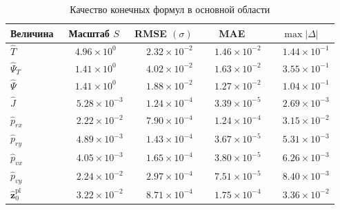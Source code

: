 \begin{table}[htbp]
	\centering
	\caption{Качество конечных формул в основной области}
	\label{tab:chap2_main_metrics}
	\begin{tabular}{l c c c c}
		\toprule
		Величина & Масштаб $S$ & RMSE $(\sigma)$ & MAE & $\max |\Delta|$ \\
		\midrule
		$\widehat{T}$ &
		$\phantom{-}4.96\times10^{0\phantom{-}}$ &
		$\phantom{-}2.32\times10^{-2}$ &
		$\phantom{-}1.46\times10^{-2}$ &
		$\phantom{-}1.44\times10^{-1}$ \\
		
		$\widehat{\Psi}_{T}$ &
		$\phantom{-}1.41\times10^{0\phantom{-}}$ &
		$\phantom{-}4.02\times10^{-2}$ &
		$\phantom{-}1.63\times10^{-2}$ &
		$\phantom{-}3.55\times10^{-1}$ \\
		
		$\widehat{\Psi}$ &
		$\phantom{-}1.41\times10^{0\phantom{-}}$ &
		$\phantom{-}1.88\times10^{-2}$ &
		$\phantom{-}1.27\times10^{-2}$ &
		$\phantom{-}1.04\times10^{-1}$ \\
		
		$\widehat{J}$ &
		$\phantom{-}5.28\times10^{-3}$ &
		$\phantom{-}1.24\times10^{-4}$ &
		$\phantom{-}3.39\times10^{-5}$ &
		$\phantom{-}2.69\times10^{-3}$ \\
		
		$\widehat{p}_{rx}$ &
		$\phantom{-}2.22\times10^{-2}$ &
		$\phantom{-}7.90\times10^{-4}$ &
		$\phantom{-}1.24\times10^{-4}$ &
		$\phantom{-}3.15\times10^{-2}$ \\
		
		$\widehat{p}_{ry}$ &
		$\phantom{-}4.89\times10^{-3}$ &
		$\phantom{-}1.43\times10^{-4}$ &
		$\phantom{-}3.67\times10^{-5}$ &
		$\phantom{-}5.31\times10^{-3}$ \\
		
		$\widehat{p}_{vx}$ &
		$\phantom{-}4.05\times10^{-3}$ &
		$\phantom{-}1.65\times10^{-4}$ &
		$\phantom{-}3.80\times10^{-5}$ &
		$\phantom{-}6.26\times10^{-3}$ \\
		
		$\widehat{p}_{vy}$ &
		$\phantom{-}2.24\times10^{-2}$ &
		$\phantom{-}2.97\times10^{-4}$ &
		$\phantom{-}7.51\times10^{-5}$ &
		$\phantom{-}8.40\times10^{-3}$ \\
		
		$\widehat{\mathbf z}^{\mathrm{pl}}_0$ &
		$\phantom{-}3.22\times10^{-2}$ &
		$\phantom{-}8.71\times10^{-4}$ &
		$\phantom{-}1.75\times10^{-4}$ &
		$\phantom{-}3.36\times10^{-2}$ \\
		\bottomrule
	\end{tabular}
\end{table}

